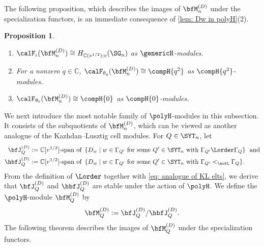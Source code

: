 \documentclass[12pt, reqno]{amsart}
\theoremstyle{plain}
\newtheorem{proposition}[proposition]{Proposition}
\theoremstyle{definition}
\numberwithin{equation}{section}
\numberwithin{figure}{section}
\numberwithin{table}{section}
\def\C{\mathbb C}
\begin{document}
The following proposition, which describes the images of $\bfM^{(D)}_n$ under the specialization functors,
 is an immediate consequence of 
\cref{lem: Dw in polyH}(2). 

\begin{proposition}\label{lem: Dn isom to regular}
\begin{enumerate}[label = {\rm (\arabic*)}]
    \item $\calF_{\iota} (\bfM^{(D)}_n) \cong H_{\C(v^{1/2});v}(\SG_n)$  as $\genericH$-modules.
    \item For a nonzero $q \in \C$, $\calF_{\theta_q} (\bfM^{(D)}_n) \cong \compH{q^2}$  as $\compH{q^2}$-modules.
    \item $\calF_{\theta_0}(\bfM^{(D)}_n) \cong \compH{0}$ as $\compH{0}$-modules.
\end{enumerate}
\end{proposition}





We next introduce the most notable family 
of $\polyH$-modules in this subsection.
It consists of the
subquotients of $\bfM^{(D)}_n$, which can be viewed as another analogue of the Kazhdan--Lusztig cell modules.
For $Q \in \SYT_n$, let
\begin{align*}
\bfJ^{(D)}_Q
&:= \C[v^{1/2}]\text{-span of } \, \{D_w \mid  \text{$w \in \Gamma_{Q'}$ for some $Q' \in \SYT_n$ with $\Gamma_{Q'} \Lorder \Gamma_Q$} \}\ \  \text{and}  \\
\hbfJ^{(D)}_Q
&:= \C[v^{1/2}]\text{-span of } \, \{D_w \mid  \text{$w \in \Gamma_{Q'}$ for some $Q' \in \SYT_n$ with $\Gamma_{Q'} <_{\scrL} \Gamma_Q$}  \}.
\end{align*}
From the definition of $\Lorder$ together with \cref{eq: analogue of KL elts}, we derive that  $\bfJ^{(D)}_Q$ and $\hbfJ^{(D)}_Q$ are stable under the action of $\polyH$.
We define the $\polyH$-module $\bfM^{(D)}_Q$ by
\begin{align}\label{def: def of MDQ}
\bfM^{(D)}_Q := \bfJ^{(D)}_Q / \hbfJ^{(D)}_Q.
\end{align}
The following theorem describes the images of $\bfM^{(D)}_Q$ under the specialization functors.
\end{document}
